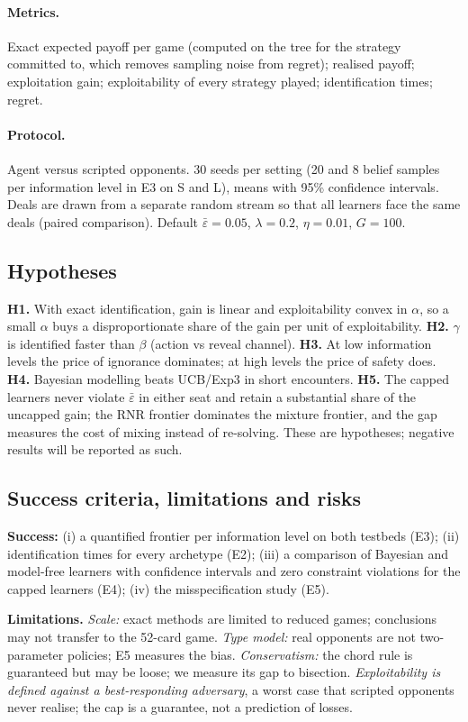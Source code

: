 \documentclass[11pt]{article}
\newcommand{\eps}{\varepsilon}
\newcommand{\epsbar}{\bar{\eps}}
\newcommand{\new}[1]{\textcolor{blue!55!black}{#1}}
\begin{document}
\paragraph{Metrics.} Exact expected payoff per game (computed on the tree for the strategy committed to, which removes sampling noise from regret); realised payoff; exploitation gain; exploitability of every strategy played; identification times; regret.
\paragraph{Protocol.} Agent versus scripted opponents. 30 seeds per setting (20 and 8 belief samples per information level in E3 on S and L), means with 95\% confidence intervals. \new{Deals are drawn from a separate random stream so that all learners face the same deals (paired comparison).} Default $\epsbar=0.05$, $\lambda=0.2$, $\eta=0.01$, $G=100$.

\subsection{Hypotheses}
\textbf{H1.} With exact identification, gain is linear and exploitability convex in $\alpha$, so a small $\alpha$ buys a disproportionate share of the gain per unit of exploitability. \textbf{H2.} $\gamma$ is identified faster than $\beta$ (action vs reveal channel). \textbf{H3.} At low information levels the price of ignorance dominates; at high levels the price of safety does. \textbf{H4.} Bayesian modelling beats UCB/Exp3 in short encounters. \new{\textbf{H5.} The capped learners never violate $\epsbar$ in either seat and retain a substantial share of the uncapped gain; the RNR frontier dominates the mixture frontier, and the gap measures the cost of mixing instead of re-solving.} These are hypotheses; negative results will be reported as such.

\subsection{Success criteria, limitations and risks}
\textbf{Success:} (i) a quantified frontier per information level on both testbeds (E3); (ii) identification times for every archetype (E2); (iii) a comparison of Bayesian and model-free learners with confidence intervals and \new{zero constraint violations for the capped learners} (E4); (iv) the misspecification study (E5).

\textbf{Limitations.} \emph{Scale:} exact methods are limited to reduced games; conclusions may not transfer to the 52-card game. \emph{Type model:} real opponents are not two-parameter policies; E5 measures the bias. \new{\emph{Conservatism:} the chord rule is guaranteed but may be loose; we measure its gap to bisection. \emph{Exploitability is defined against a best-responding adversary}, a worst case that scripted opponents never realise; the cap is a guarantee, not a prediction of losses.}
\end{document}
